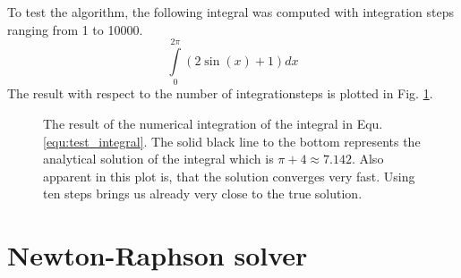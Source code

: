 \documentclass{aa}
\begin{document}
To test the algorithm, the following integral was computed with integration
steps ranging from 1 to 10000.
\begin{equation}
    \label{equ:test_integral}
    \int\limits_0^{2\pi} (2\sin(x) + 1) dx
\end{equation}
The result with respect to the number of integrationsteps is plotted in Fig.
\ref{fig:Simpson_results}.
\begin{figure}[htbp]
    \caption{The result of the numerical integration of the integral in Equ.
    \ref{equ:test_integral}. The solid black line to the bottom represents the
    analytical solution of the integral which is \(\pi + 4 \approx 7.142\). Also
    apparent in this plot is, that the solution converges very fast. Using ten
    steps brings us already very close to the true solution.}
    \label{fig:Simpson_results}
\end{figure}

\section{Newton-Raphson solver}%
\label{sec:newton_raphson_solver}
\end{document}
